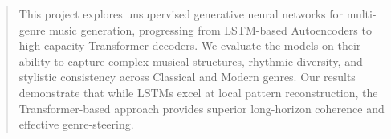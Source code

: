 \documentclass{article}
\theoremstyle{plain}
\theoremstyle{definition}
\theoremstyle{remark}
\begin{document}




\begin{abstract}
This project explores unsupervised generative neural networks for multi-genre music generation, progressing from LSTM-based Autoencoders to high-capacity Transformer decoders. We evaluate the models on their ability to capture complex musical structures, rhythmic diversity, and stylistic consistency across Classical and Modern genres. Our results demonstrate that while LSTMs excel at local pattern reconstruction, the Transformer-based approach provides superior long-horizon coherence and effective genre-steering.
\end{abstract}
\end{document}
